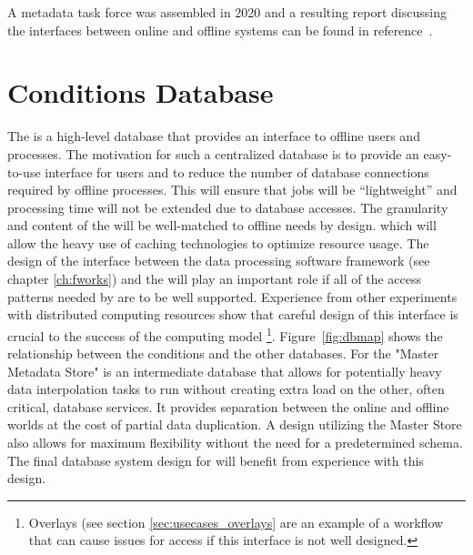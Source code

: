 \documentclass[../main-v1.tex]{subfiles}
\begin{document}
A  metadata task force was assembled in 2020 and a resulting report discussing the interfaces between online and offline systems can be found in reference~\cite{bib:docdb22983}.

\section{Conditions Database}
\label{sec:db:conditions} 

The  is a high-level database that provides an interface to offline users and processes. The motivation for such a centralized database is to provide an easy-to-use interface for users and to reduce the number of database connections required by offline processes. This will ensure that jobs will be ``lightweight'' and processing time will not be extended due to database accesses.  The granularity and content of the  will be well-matched to offline needs by design. which will allow the heavy use of caching technologies to optimize resource usage. The design of the interface between the data processing software framework (see chapter \ref{ch:fworks}) and the  will play an important role if all of the access patterns needed by  are to be well supported. Experience from other  experiments with distributed computing resources show that careful design of this interface is crucial to the success of the computing model \footnote{Overlays (see section \ref{sec:usecases_overlays} are an example of a workflow that can cause issues for  access if this interface is not well designed.}.
Figure~\ref{fig:dbmap} shows the relationship between the conditions  and the other  databases. For  the "Master Metadata Store" is an intermediate database that allows for potentially heavy data interpolation tasks to run without creating extra load on the other, often critical, database services.  It provides separation between the online and offline worlds at the cost of partial data duplication. A design utilizing the Master Store also allows for maximum flexibility without the need for a predetermined schema. The final database system design for  will benefit from experience with this design.
\end{document}
